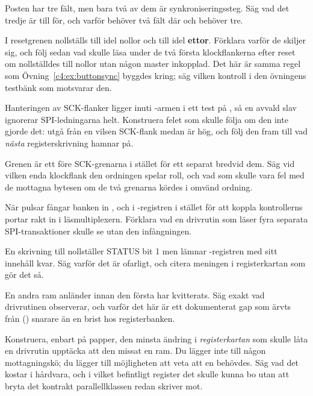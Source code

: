  Posten  har tre fält, men bara två av dem är synkroniseringssteg. Säg vad det
tredje är till för, och varför  behöver två fält där  och  behöver
tre.

 I resetgrenen nollställs  till idel nollor och  till idel
\textbf{ettor}. Förklara varför de skiljer sig, och följ sedan vad  skulle läsa under
de två första klockflankerna efter reset om  nollställdes till nollor utan någon master
inkopplad. Det här är samma regel som Övning~\ref{c4:ex:buttonsync} byggdes kring; säg vilken kontroll
i den övningens testbänk som motsvarar den.

 Hanteringen av SCK-flanker ligger inuti -armen i ett test på , så
en avvald slav ignorerar SPI-ledningarna helt. Konstruera felet som skulle följa om den inte gjorde
det: utgå från en vilsen SCK-flank medan  är hög, och följ den fram till vad \emph{nästa}
registerskrivning hamnar på.

 Grenen  är ett  före SCK-grenarna i stället för ett separat
 bredvid dem. Säg vid vilken enda klockflank den ordningen spelar roll, och vad som skulle
vara fel med de mottagna bytesen om de två grenarna kördes i omvänd ordning.

\label{c18:ex:capture}
 När  pulsar fångar banken in ,  och 
i -registren i stället för att koppla kontrollerns portar rakt in i läsmultiplexern.
Förklara vad en drivrutin som läser fyra separata SPI-transaktioner skulle se utan den infångningen.

 En skrivning till  nollställer STATUS bit 1 men lämnar -registren
med sitt innehåll kvar. Säg varför det är ofarligt, och citera meningen i registerkartan som gör det
så.

 En andra ram anländer innan den första har kvitterats. Säg exakt vad drivrutinen
observerar, och varför det här är ett dokumenterat gap som ärvts från 
() snarare än en brist hos registerbanken.

 Konstruera, enbart på papper, den minsta ändring i \emph{registerkartan} som skulle låta en
drivrutin upptäcka att den missat en ram. Du lägger inte till någon mottagningskö; du lägger till
möjligheten att veta att en behövdes. Säg vad det kostar i hårdvara, och i vilket befintligt register
det skulle kunna bo utan att bryta det kontrakt parallellklassen redan skriver mot.
